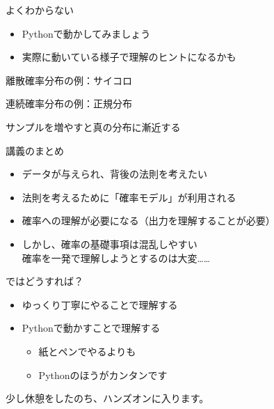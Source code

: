 \documentclass[dvipdfmx,cjk]{beamer}
\begin{document}
\begin{frame}{よくわからない} \pause

\begin{itemize}
    \item Pythonで動かしてみましょう
    \item 実際に動いている様子で理解のヒントになるかも
\end{itemize}

\end{frame}


\begin{frame}{離散確率分布の例：サイコロ}


\end{frame}


\begin{frame}{連続確率分布の例：正規分布}


\end{frame}


\begin{frame}{サンプルを増やすと真の分布に漸近する}


\end{frame}



\begin{frame}{講義のまとめ} \pause

\begin{itemize}
    \item データが与えられ、背後の法則を考えたい \pause
    \item 法則を考えるために「確率モデル」が利用される \pause
    \item 確率への理解が必要になる（出力を理解することが必要） \pause
    \item しかし、確率の基礎事項は混乱しやすい\\
          確率を一発で理解しようとするのは大変…… \pause
\end{itemize}

\vskip 1cm
ではどうすれば？ \pause

\begin{itemize}
    \item ゆっくり丁寧にやることで理解する \pause
    \item Pythonで動かすことで理解する \pause
        \begin{itemize}
        \item 紙とペンでやるよりも
        \item Pythonのほうがカンタンです
        \end{itemize}
\end{itemize} \pause

\vskip 1cm
少し休憩をしたのち、ハンズオンに入ります。

\end{frame}
\end{document}
